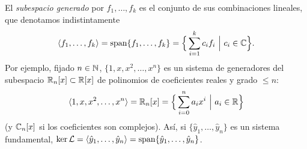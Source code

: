 \documentclass[11pt,twoside]{article}
\newcommand\Lop{\mathcal L}
\newcommand\yh{\hat y}
\newcommand\gen[1]{\langle#1\rangle}
\begin{document}
\begin{notacion}\label{not:span}
El \emph{subespacio generado} por $f_1,\dots,f_k$ es el conjunto de sus combinaciones lineales, que denotamos
indistintamente
\begin{equation}\label{eq:span}
\gen{f_1,\dots,f_k}=\spn\{f_1,\dots,f_k\}=\Big\{\sum_{i=1}^{k}c_if_i\ \Big|\ c_i\in\C\Big\}.
\end{equation}
Por ejemplo, fijado $n\in\mathbb{N}$, $\{1,x,x^2,\dots,x^n\}$ es un sistema de generadores del subespacio $\mathbb{R}_n[x]\subset\mathbb{R}[x]$
de polinomios de coeficientes reales y grado $\le n$:
\begin{equation*}
\gen{1,x,x^2,\dots,x^n}=\R_n[x]=\Big\{\sum_{i=0}^{n}a_ix^i\ \Big|\ a_i\in\R\Big\}
\end{equation*}
(y $\mathbb{C}_n[x]$ si los coeficientes son complejos). Así, si $\{\yh_1,\dots,\yh_n\}$ es un sistema fundamental,
$\ker\Lop=\gen{\yh_1,\dots,\yh_n}=\spn\{\yh_1,\dots,\yh_n\}$.
\end{notacion}
\end{document}
